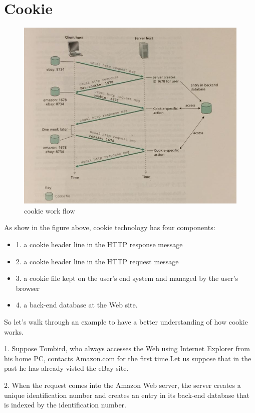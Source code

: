\documentclass[fancy,11pt,titlestyle=display]{style/elegantbook}
\begin{document}
\graphicspath{{image/myfolder/}}
\section{Cookie}
\begin{figure}[htp]
    \centering
    \includegraphics[width=\textwidth]{image/myfolder/cookie.png}
    \caption{cookie work flow}
\end{figure}

As show in the figure above, cookie technology has four components:
\begin{itemize}
\item 1. a cookie header line in the HTTP response message
\item 2. a cookie header line in the HTTP request message
\item 3. a cookie file kept on the user's end system and managed by the user's browser
\item 4. a back-end database at the Web site.
\end{itemize}
\*
So let's walk through an example to have a better understanding of how cookie works.

\setlength{\parindent}{10ex}
1. Suppose Tombird, who always accesses the Web using Internet Explorer from his home PC, contacts Amazon.com for the first time.Let us suppose that in the past he has already visted the eBay site. 

2. When the request comes into the Amazon Web server, the server creates a unique identification number and creates an entry in its back-end database that is indexed by the identification number.
\end{document}
